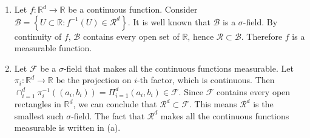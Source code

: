 \begin{problem}[1.3.4] \hfill
	
	\begin{enumerate}[label = (\alph*)]
		\item Let $f:\mathbb{R}^d \rightarrow \mathbb{R}$ be a continuous function. Consider $\mathcal{B} = \left\{ U \subset \mathbb{R} : f^{-1}\left( U \right) \in \mathcal{R}^d \right\}$. It is well known that $\mathcal{B}$ is a $\sigma$-field. By continuity of $f$, $\mathcal{B}$ contains every open set of $\mathbb{R}$, hence $\mathcal{R} \subset \mathcal{B}$. Therefore $f$ is a measurable function.

		\item Let $\mathcal{F}$ be a $\sigma$-field that makes all the continuous functions measurable.
			Let $\pi_i : \mathbb{R}^d \rightarrow \mathbb{R}$ be the projection on $i$-th factor, which is continuous.
			Then $\cap_{i=1}^{d}\pi_i^{-1}\left( (a_i, b_i) \right) = \Pi_{i=1}^{d}(a_i, b_i) \in \mathcal{F}$. 
			Since $\mathcal{F}$ contains every open rectangles in $\mathbb{R}^d$, we can conclude that $\mathcal{R}^d \subset \mathcal{F}$. This means $\mathcal{R}^d$ is the smallest such $\sigma$-field.
			The fact that $\mathcal{R}^d$ makes all the continuous functions measurable is written in (a).
	\end{enumerate}
	
\end{problem}
